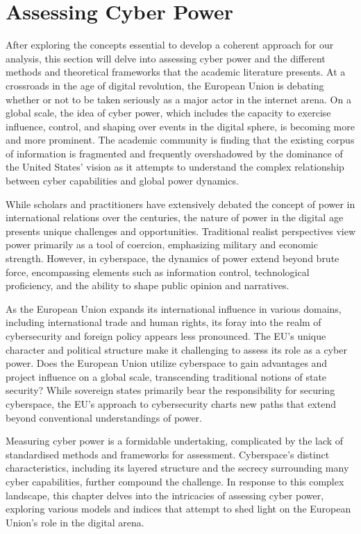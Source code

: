 \chapter{Assessing Cyber Power}

After exploring the concepts essential to develop a coherent approach for our analysis, this section will delve into assessing cyber power and the different methods and theoretical frameworks that the academic literature presents.  At a crossroads in the age of digital revolution, the European Union is debating whether or not to be taken seriously as a major actor in the internet arena. On a global scale, the idea of cyber power, which includes the capacity to exercise influence, control, and shaping over events in the digital sphere, is becoming more and more prominent. The academic community is finding that the existing corpus of information is fragmented and frequently overshadowed by the dominance of the United States' vision as it attempts to understand the complex relationship between cyber capabilities and global power dynamics.

While scholars and practitioners have extensively debated the concept of power in international relations over the centuries, the nature of power in the digital age presents unique challenges and opportunities. Traditional realist perspectives view power primarily as a tool of coercion, emphasizing military and economic strength. However, in cyberspace, the dynamics of power extend beyond brute force, encompassing elements such as information control, technological proficiency, and the ability to shape public opinion and narratives.

As the European Union expands its international influence in various domains, including international trade and human rights, its foray into the realm of cybersecurity and foreign policy appears less pronounced. The EU's unique character and political structure make it challenging to assess its role as a cyber power. Does the European Union utilize cyberspace to gain advantages and project influence on a global scale, transcending traditional notions of state security? While sovereign states primarily bear the responsibility for securing cyberspace, the EU's approach to cybersecurity charts new paths that extend beyond conventional understandings of power.

Measuring cyber power is a formidable undertaking, complicated by the lack of standardised methods and frameworks for assessment. Cyberspace's distinct characteristics, including its layered structure and the secrecy surrounding many cyber capabilities, further compound the challenge. In response to this complex landscape, this chapter delves into the intricacies of assessing cyber power, exploring various models and indices that attempt to shed light on the European Union's role in the digital arena.

